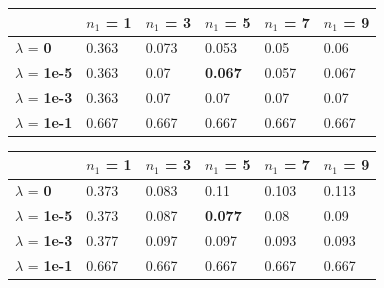 \documentclass[10pt]{article}
\begin{document}
\begin{table}
\centering
\begin{tabular}{llllll}
\toprule
& $n_1$ = \bf{1} & $n_1$ =  \bf{3} & $n_1$ =  \bf{5} & $n_1$ =  \bf{7} & $n_1$ =  \bf{9} \\
\midrule
$\lambda$ = \bf{0} &       0.363 & 0.073 & 0.053 & 0.05  & 0.06  \\
$\lambda$ = \bf{1e-5} &   0.363 & 0.07  & \bf{0.067} & 0.057 & 0.067 \\
$\lambda$ = \bf{1e-3} &   0.363 & 0.07  & 0.07  & 0.07  & 0.07  \\
$\lambda$ = \bf{1e-1} &   0.667 & 0.667 & 0.667 & 0.667 & 0.667 \\
\bottomrule
\end{tabular}
\end{table}
	
\begin{table}
\centering
\begin{tabular}{llllll}
\toprule
& $n_1$ = \bf{1} & $n_1$ =  \bf{3} & $n_1$ =  \bf{5} & $n_1$ =  \bf{7} & $n_1$ =  \bf{9} \\
\midrule
$\lambda$ = \bf{0} &        0.373 & 0.083 & 0.11  & 0.103 & 0.113 \\
$\lambda$ = \bf{1e-5} &    0.373 & 0.087 & \bf{0.077} & 0.08  & 0.09  \\
$\lambda$ = \bf{1e-3} &    0.377 & 0.097 & 0.097 & 0.093 & 0.093 \\
$\lambda$ = \bf{1e-1} &    0.667 & 0.667 & 0.667 & 0.667 & 0.667 \\
\bottomrule
\end{tabular}
\end{table}
\end{document}
